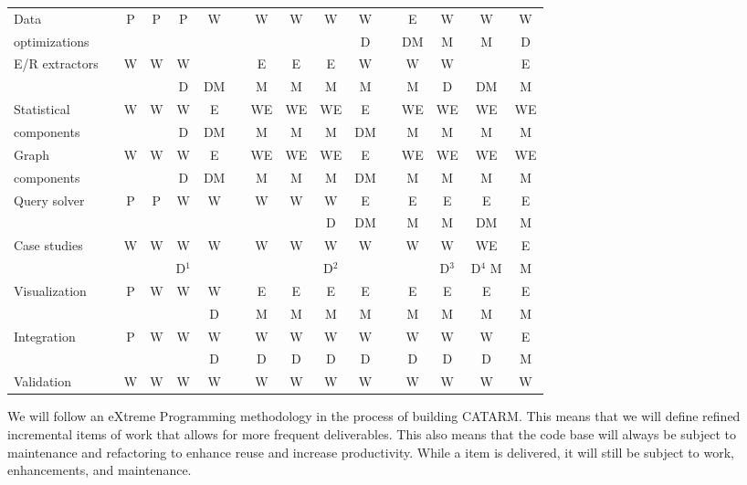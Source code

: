 \documentclass[12pt]{article}
\begin{document}
\begin{table}[bt]
\begin{tabular}{lp{.1cm}ccccp{.1cm}ccccp{.1cm}cccc}
Data  & & 
P & P & P & W & & W & W & W & W & & E & W & W & W \\ 
optimizations & & 
 &  &  &  & &  &  &  & D & & DM & M & M & D \\ \hline

\multirow{2}{*}{E/R extractors} & & 
W & W & W &  & & E & E & E & W & & W & W &  & E \\ 
& & 
 &  & D & DM & & M & M & M & M & & M & D & DM & M \\ \hline

Statistical & & 
W & W & W & E & & WE & WE & WE & E & & WE & WE & WE & WE \\ 
components & & 
 &  & D & DM & & M & M & M & DM & & M & M & M & M \\ \hline

Graph  & & 
W & W & W & E & & WE & WE & WE & E & & WE & WE & WE & WE \\ 
components & & 
 &  & D & DM & & M & M & M & DM & & M & M & M & M \\ \hline

\multirow{2}{*}{Query solver} & & 
P & P & W & W & & W & W & W & E & & E & E & E & E \\ 
& & 
 &  &  &  & &  &  & D & DM & & M & M & DM & M \\ \hline

\multirow{2}{*}{Case studies} & & 
W & W & W & W & & W & W & W & W & & W & W & WE & E \\ 
& & 
 &  & D$^1$ &  & &  &  & D$^2$ &  & &  & D$^3$ & D$^4$ M & M \\ \hline

\multirow{2}{*}{Visualization} & & 
P & W & W & W & & E & E & E & E & & E & E & E & E \\ 
& & 
 &  &  & D & & M & M & M & M & & M & M & M & M \\ \hline

\multirow{2}{*}{Integration} & & 
P & W & W & W & & W & W & W & W & & W & W & W & E \\ 
& & 
 &  &  & D & & D & D & D & D & & D & D & D & M \\  \hline

Validation & & 
W & W & W & W & & W & W & W & W & & W & W & W & W \\  \bottomrule
\end{tabular}
\normalsize
\label{t:workplan}
\end{table}

We will follow an eXtreme Programming 
methodology in the process of building CATARM.
This means that we will define refined incremental items of 
work that allows for more frequent deliverables. 
This also means that the code base will always be subject
to maintenance and refactoring to enhance reuse and 
increase productivity. 
While a item is delivered, it will still be subject to work,
enhancements, and maintenance. 
\end{document}
